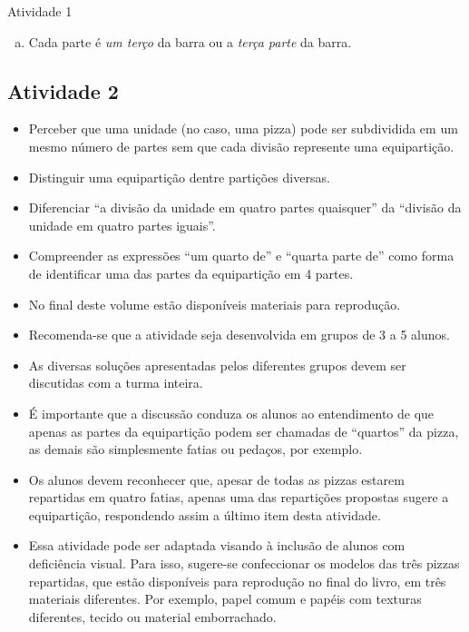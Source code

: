 \begin{multicols}{2}
\begin{resposta*}{Atividade 1}
\begin{enumerate}[a),wide,labelindent=0pt]
    \item       Cada parte é {\it um terço} da barra ou a {\it terça parte} da barra.
\end{enumerate} %
\end{resposta*}

\subsection{Atividade 2}

   \vspace{.1cm}

\begin{itemize} %
    \item       Perceber que uma unidade (no caso, uma pizza) pode ser subdividida em um mesmo número de partes sem que cada divisão represente uma equipartição.
    \item       Distinguir uma equipartição dentre partições diversas.
    \item       Diferenciar       ``a divisão da unidade em quatro partes quaisquer'' da       ``divisão da unidade em quatro partes iguais''.
    \item       Compreender as expressões ``um quarto de'' e ``quarta parte de'' como forma de identificar uma das partes da equipartição em 4 partes.
\end{itemize} %
 \vspace{.1cm}

   \vspace{.1cm}

  \begin{itemize} %
    \item No final deste volume estão disponíveis materiais para reprodução.
    \item Recomenda-se que a atividade seja desenvolvida em grupos de 3 a 5 alunos.
    \item As diversas soluções apresentadas pelos diferentes grupos devem ser discutidas com a turma inteira.
    \item É importante que a discussão conduza os alunos ao entendimento de que apenas as partes da equipartição podem ser chamadas de ``quartos'' da pizza, as demais são simplesmente fatias ou pedaços, por exemplo.
    \item Os alunos devem reconhecer que, apesar de todas as pizzas estarem repartidas em quatro fatias, apenas uma das repartições propostas sugere a equipartição, respondendo assim a último item desta atividade.
    \item       Essa atividade pode ser adaptada visando à inclusão de alunos com deficiência visual. Para isso, sugere-se confeccionar os modelos das três pizzas repartidas, que estão disponíveis para reprodução no final do livro, em três materiais diferentes. Por exemplo, papel comum e papéis com texturas diferentes, tecido ou material emborrachado.
\end{itemize} %



\end{multicols}
